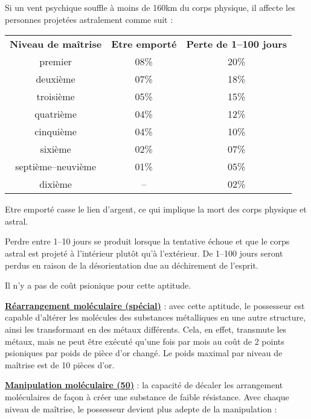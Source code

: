 \bigskip

Si un vent psychique souffle à moins de 160km du corps physique, il affecte les personnes projetées astralement comme suit :

\bigskip

\begin{tabular}{ccc}
\textbf{Niveau de maîtrise} & \textbf{Etre emporté} & \textbf{Perte de 1--100 jours} \\
premier            & 08\% & 20\% \\
deuxième           & 07\% & 18\% \\
troisième          & 05\% & 15\% \\
quatrième          & 04\% & 12\% \\
cinquième          & 04\% & 10\% \\
sixième            & 02\% & 07\% \\
septième--neuvième & 01\% & 05\% \\
dixième            & --   & 02\% \\
\end{tabular}

\medskip

Etre emporté casse le lien d'argent, ce qui implique la mort des corps physique et astral.

\bigskip

Perdre entre 1--10 jours se produit lorsque la tentative échoue et que le corps astral est projeté à l'intérieur plutôt qu'à l'extérieur. De 1--100 jours seront perdus en raison de la désorientation due au déchirement de l'esprit.

\bigskip

Il n'y a pas de coût psionique pour cette aptitude.

\bigskip

\label{guerrier-rearrange-mol}\textbf{\uline{Réarrangement moléculaire (spécial)}} : avec cette aptitude, le possesseur est capable d'altérer les molécules des substances métalliques en une autre structure, ainsi les transformant en des métaux différents. Cela, en effet, transmute les métaux, mais ne peut être exécuté qu'une fois par mois au coût de 2 points psioniques par poids de pièce d'or changé. Le poids maximal par niveau de maîtrise est de 10 pièces d'or.

\bigskip

\label{guerrier-manip-mol}\textbf{\uline{Manipulation moléculaire (50)}} : la capacité de décaler les arrangement moléculaires de façon à créer une substance de faible résistance. Avec chaque niveau de maîtrise, le possesseur devient plus adepte de la manipulation :

